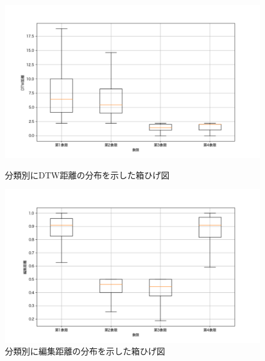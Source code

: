 \documentclass[T,J]{fose} %
\begin{document}
\begin{figure}[t]
	\centering
	\includegraphics[width=1.0\linewidth]{Okamoto_fig/DTW-out.pdf}
	\caption{分類別にDTW距離の分布を示した箱ひげ図}
	\label{fig:dtw-boxplot}

	\centering
	\includegraphics[width=1.0\linewidth]{Okamoto_fig/distance-out.pdf}
	\caption{分類別に編集距離の分布を示した箱ひげ図}
	\label{fig:distance-boxplot}
\end{figure}


\end{document}
